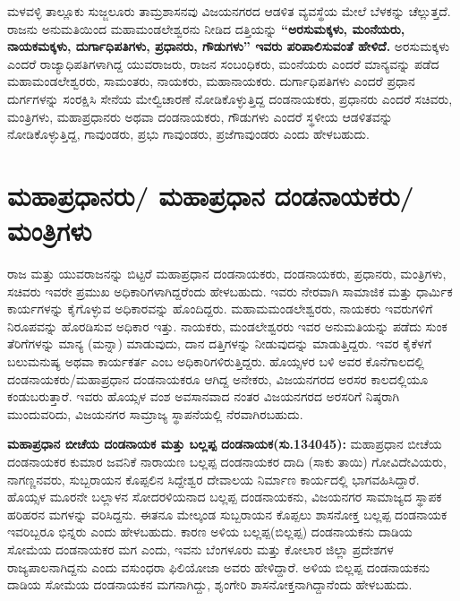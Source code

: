 ಮಳವಳ್ಳಿ ತಾಲ್ಲೂಕು ಸುಜ್ಜಲೂರು ತಾಮ್ರಶಾಸನವು ವಿಜಯನಗರದ ಆಡಳಿತ ವ್ಯವಸ್ಥೆಯ ಮೇಲೆ ಬೆಳಕನ್ನು ಚೆಲ್ಲುತ್ತದೆ. ರಾಜನು ಅನುಮತಿಯಿಂದ ಮಹಾಮಂಡಲೇಶ್ವರನು ನೀಡಿದ ದತ್ತಿಯನ್ನು \textbf{“ಅರಸುಮಕ್ಕಳು, ಮಂನೆಯರು, ನಾಯಕಮಕ್ಕಳು, ದುರ್ಗಾಧಿಪತಿಗಳು, ಪ್ರಧಾನರು, ಗೌಡುಗಳು” ಇವರು ಪರಿಪಾಲಿಸುವಂತೆ ಹೇಳಿದೆ.} ಅರಸುಮಕ್ಕಳು ಎಂದರೆ ರಾಜ್ಯಾಧಿಪತಿ\-ಗಳಾಗಿದ್ದ ಯುವರಾಜರು, ರಾಜನ ಸಂಬಂಧಿಕರು, ಮಂನೆಯರು ಎಂದರೆ ಮಾನ್ಯವನ್ನು ಪಡೆದ ಮಹಾಮಂಡಲೇಶ್ವರರು, ಸಾಮಂತರು, ನಾಯಕರು, ಮಹಾನಾಯಕರು. ದುರ್ಗಾಧಿಪತಿಗಳು ಎಂದರೆ ಪ್ರಧಾನ ದುರ್ಗಗಳನ್ನು ಸಂರಕ್ಷಿಸಿ ಸೇನೆಯ ಮೇಲ್ವಿಚಾರಣೆ ನೋಡಿಕೊಳ್ಳುತ್ತಿದ್ದ ದಂಡನಾಯಕರು, ಪ್ರಧಾನರು ಎಂದರೆ ಸಚಿವರು, ಮಂತ್ರಿಗಳು, ಮಹಾಪ್ರಧಾನರು ಅಥವಾ ದಂಡನಾಯಕರು, ಗೌಡುಗಳು ಎಂದರೆ ಸ್ಥಳೀಯ ಆಡಳಿತವನ್ನು ನೋಡಿಕೊಳ್ಳುತ್ತಿದ್ದ, ಗಾವುಂಡರು, ಪ್ರಭು ಗಾವುಂಡರು, ಪ್ರಜೆಗಾವುಂಡರು ಎಂದು ಹೇಳಬಹುದು.


\section*{ಮಹಾಪ್ರಧಾನರು/ ಮಹಾಪ್ರಧಾನ ದಂಡನಾಯಕರು/ಮಂತ್ರಿಗಳು}

ರಾಜ ಮತ್ತು ಯುವರಾಜನನ್ನು ಬಿಟ್ಟರೆ ಮಹಾಪ್ರಧಾನ ದಂಡನಾಯಕರು, ದಂಡನಾಯಕರು, ಪ್ರಧಾನರು, ಮಂತ್ರಿಗಳು, ಸಚಿವರು ಇವರೇ ಪ್ರಮುಖ ಅಧಿಕಾರಿಗಳಾಗಿದ್ದರೆಂದು ಹೇಳಬಹುದು. ಇವರು ನೇರವಾಗಿ ಸಾಮಾಜಿಕ ಮತ್ತು ಧಾರ್ಮಿಕ ಕಾರ್ಯಗಳನ್ನು ಕೈಗೊಳ್ಳುವ ಅಧಿಕಾರವನ್ನು ಹೊಂದಿದ್ದರು. ಮಹಾಮಮಂಡಲೇಶ್ವರರು, ನಾಯಕರು ಇವರುಗಳಿಗೆ ನಿರೂಪವನ್ನು ಹೊರಡಿಸುವ ಅಧಿಕಾರ ಇತ್ತು. ನಾಯಕರು, ಮಂಡಲೇಶ್ವರರು ಇವರ ಅನುಮತಿಯನ್ನು ಪಡೆದು ಸುಂಕ ತೆರಿಗೆ\-ಗಳನ್ನು ಮಾನ್ಯ (ಮನ್ನಾ) ಮಾಡುವುದು, ದಾನ ದತ್ತಿಗಳನ್ನು ನೀಡುವುದನ್ನು ಮಾಡುತ್ತಿದ್ದರು. ಇವರ ಕೈಕೆಳಗೆ ಬಲುಮನುಷ್ಯ ಅಥವಾ ಕಾರ್ಯಕರ್ತ ಎಂಬ ಅಧಿಕಾರಿಗಳಿರುತ್ತಿದ್ದರು. ಹೊಯ್ಸಳರ ಬಳಿ ಅವರ ಕೊನೆಗಾಲದಲ್ಲಿ ದಂಡನಾಯಕರು/\-ಮಹಾಪ್ರಧಾನ ದಂಡನಾಯಕರೂ ಆಗಿದ್ದ ಅನೇಕರು, ವಿಜಯನಗರದ ಅರಸರ ಕಾಲದಲ್ಲಿಯೂ ಕಂಡುಬರುತ್ತಾರೆ. ಇವರು ಹೊಯ್ಸಳ ವಂಶ ಅವಸಾನವಾದ ನಂತರ ವಿಜಯನಗರದ ಅರಸರಿಗೆ ನಿಷ್ಠರಾಗಿ ಮುಂದುವರಿದು, ವಿಜಯನಗರ ಸಾಮ್ರಾಜ್ಯ ಸ್ಥಾಪನೆಯಲ್ಲಿ ನೆರವಾಗಿರಬಹುದು.

\textbf{ಮಹಾಪ್ರಧಾನ ಬೀಚೆಯ ದಂಡನಾಯಕ ಮತ್ತು ಬಲ್ಲಪ್ಪ ದಂಡನಾಯಕ(ಸು.1340\general{\enginline{-}}45):} ಮಹಾಪ್ರಧಾನ ಬೀಚೆಯ ದಂಡನಾಯಕರ ಕುಮಾರ ಜವನಿಕೆ ನಾರಾಯಣ ಬಲ್ಲಪ್ಪ ದಂಡನಾಯಕರ ದಾದಿ (ಸಾಕು ತಾಯಿ) ಗೋವಿದೇವಿಯರು, ನಾಗಣ್ಣನವರು, ಸುಬ್ಬರಾಯನ ಕೊಪ್ಪಲಿನ ಸಿದ್ದೇಶ್ವರ ದೇವಾಲಯ ನಿರ್ಮಾಣ ಕಾರ್ಯದಲ್ಲಿ ಭಾಗವಹಿಸಿದ್ದಾರೆ. ಹೊಯ್ಸಳ ಮೂರನೇ ಬಲ್ಲಾಳನ ಸೋದರಳಿಯನಾದ ಬಲ್ಲಪ್ಪ ದಂಡನಾಯಕನು, ವಿಜಯನಗರ ಸಾಮಾಜ್ಯದ ಸ್ಥಾಪಕ ಹರಿಹರನ ಮಗಳನ್ನು ವರಿಸಿದ್ದನು. ಈತನೂ ಮೇಲ್ಕಂಡ ಸುಬ್ಬರಾಯನ ಕೊಪ್ಪಲು ಶಾಸನೋಕ್ತ ಬಲ್ಲಪ್ಪ ದಂಡನಾಯಕ ಇವರಿಬ್ಬರೂ ಭಿನ್ನರು ಎಂದು ಹೇಳಬಹುದು. ಕಾರಣ ಅಳಿಯ ಬಲ್ಲಪ್ಪ(ಬಿಲ್ಲಪ್ಪ) ದಂಡನಾಯಕನು ದಾಡಿಯ ಸೋಮೆಯ ದಂಡನಾಯಕರ ಮಗ ಎಂದು, ಇವನು ಬೆಂಗಳೂರು ಮತ್ತು ಕೋಲಾರ ಜಿಲ್ಲಾ ಪ್ರದೇಶಗಳ ರಾಜ್ಯಪಾಲನಾಗಿದ್ದನು ಎಂದು ವಸುಂಧರಾ ಫಿಲಿಯೋಜಾ ಅವರು ಹೇಳಿದ್ದಾರೆ. ಅಳಿಯ ಬಿಲ್ಲಪ್ಪ ದಂಡನಾಯಕನು ದಾಡಿಯ ಸೋಮೆಯ ದಂಡನಾಯಕನ ಮಗನಾಗಿದ್ದು, ಶೃಂಗೇರಿ ಶಾಸನೋಕ್ತನಾಗಿದ್ದಾನೆಂದು ಹೇಳಬಹುದು.


